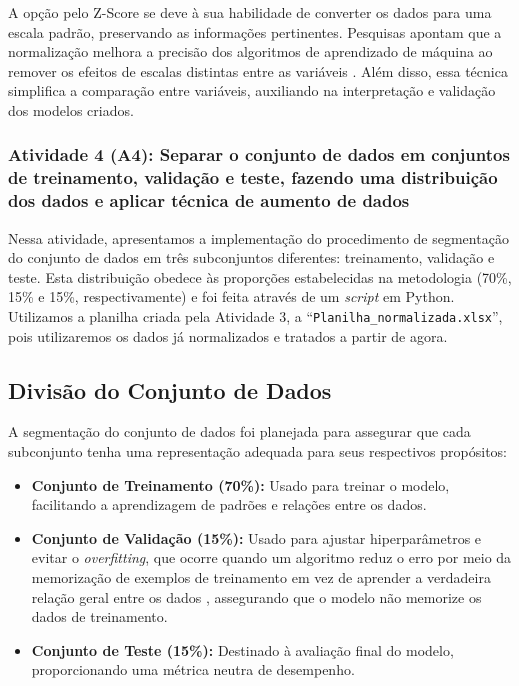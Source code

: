 A opção pelo Z-Score se deve à sua habilidade de converter os dados para uma escala padrão, preservando as informações pertinentes. Pesquisas apontam que a normalização melhora a precisão dos algoritmos de aprendizado de máquina ao remover os efeitos de escalas distintas entre as variáveis \cite{jaiswal2024}. Além disso, essa técnica simplifica a comparação entre variáveis, auxiliando na interpretação e validação dos modelos criados.

\subsubsection{Atividade 4 (A4): Separar o conjunto de dados em conjuntos de treinamento, validação e teste, fazendo uma distribuição dos dados e aplicar técnica de aumento de dados}
Nessa atividade, apresentamos a implementação do procedimento de segmentação do conjunto de dados em três subconjuntos diferentes: treinamento, validação e teste. Esta distribuição obedece às proporções estabelecidas na metodologia (70\%, 15\% e 15\%, respectivamente) e foi feita através de um \textit{script} em Python. Utilizamos a planilha criada pela Atividade 3, a ``\texttt{Planilha\_normalizada.xlsx}'', pois utilizaremos os dados já normalizados e tratados a partir de agora.

\subsection*{Divisão do Conjunto de Dados}
A segmentação do conjunto de dados foi planejada para assegurar que cada subconjunto tenha uma representação adequada para seus respectivos propósitos: 
\begin{itemize}
    \item \textbf{Conjunto de Treinamento (70\%):} Usado para treinar o modelo, facilitando a aprendizagem de padrões e relações entre os dados.
    \item \textbf{Conjunto de Validação (15\%):} Usado para ajustar hiperparâmetros e evitar o \textit{overfitting}, que ocorre quando um algoritmo reduz o erro por meio da memorização de exemplos de treinamento em vez de aprender a verdadeira relação geral entre os dados \cite{bashir2020}, assegurando que o modelo não memorize os dados de treinamento.
    \item \textbf{Conjunto de Teste (15\%):} Destinado à avaliação final do modelo, proporcionando uma métrica neutra de desempenho.
\end{itemize}

